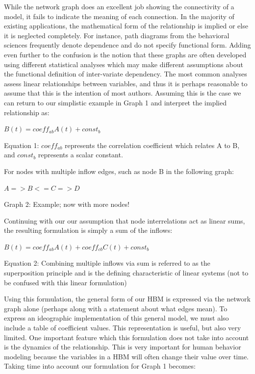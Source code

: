 \documentclass[conference]{IEEEtran}
\begin{document}
While the network graph does an excellent job showing the connectivity of a model, it fails to indicate the meaning of each connection.
In the majority of existing applications, the mathematical form of the relationship is implied or else it is neglected completely.
For instance, path diagrams from the behavioral sciences frequently denote dependence and do not specify functional form.
Adding even further to the confusion is the notion that these graphs are often developed using different statistical analyses which may make different assumptions about the functional definition of inter-variate dependency.
The most common analyses assess linear relationships between variables, and thus it is perhaps reasonable to assume that this is the intention of most authors.
Assuming this is the case we can return to our simplistic example in Graph 1 and interpret the implied relationship as:

$B(t) = coeff_{ab}A(t) + const_b$

Equation 1: $coeff_{ab}$ represents the correlation coefficient which relates A to B, 
and $const_b$ represents a scalar constant.

For nodes with multiple inflow edges, such as node B in the following graph:

$A => B <= C => D$

Graph 2: Example; now with more nodes!

Continuing with our our assumption that node interrelations act as linear sums, the resulting formulation is simply a sum of the inflows:

$B(t) = coeff_{ab}A(t) + coeff_{cb}C(t) + const_b$

Equation 2: Combining multiple inflows via sum is referred to as the superposition principle and is the defining characteristic of linear systems (not to be confused with this linear formulation)

Using this formulation, the general form of our HBM is expressed via the network graph alone (perhaps along with a statement about what edges mean).
To express an ideographic implementation of this general model, we must also include a table of coefficient values. This representation is useful, but also very limited.
One important feature which this formulation does not take into account is the dynamics of the relationship.
This is very important for human behavior modeling because the variables in a HBM will often change their value over time.
Taking time into account our formulation for Graph 1 becomes:
\end{document}
